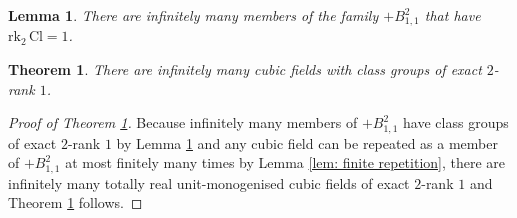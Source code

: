 \documentclass[10pt,a4paper]{amsart}
\newtheorem{theorem}{Theorem}
\newtheorem{lemma}{Lemma}
\newcommand{\Cl}{\mathrm{Cl}}
\newcommand{\rk}{\mathrm{rk}}
\begin{document}
\begin{lemma}\label{lem: infinitely many have rk_2 = 1}
    There are infinitely many members of the family $+B_{1,1}^2$ that have $\rk_2 \, \Cl = 1$.
\end{lemma}

\begin{theorem} \label{thm: main theorem}
    There are infinitely many cubic fields with class groups of exact $2$-rank $1$.
\end{theorem}

\begin{proof}[Proof of Theorem \ref{thm: main theorem}]
Because infinitely many members of $+B_{1,1}^2$ have class groups of exact $2$-rank $1$ by Lemma \ref{lem: infinitely many have rk_2 = 1} and any cubic field can be repeated as a member of $+B_{1,1}^2$ at most finitely many times by Lemma \ref{lem: finite repetition}, there are infinitely many totally real unit-monogenised cubic fields of exact $2$-rank $1$ and Theorem \ref{thm: main theorem} follows. 
\end{proof}
\end{document}
